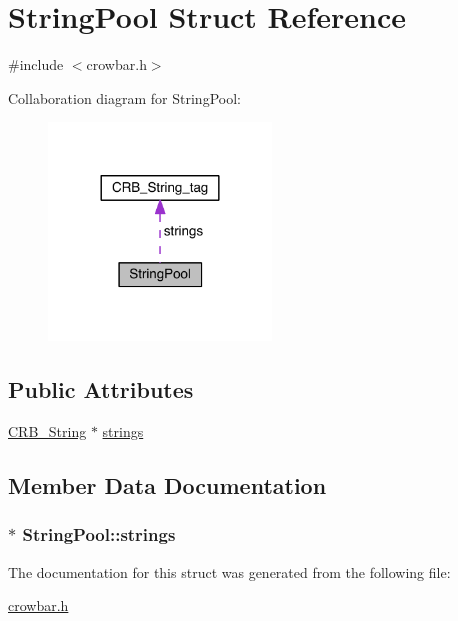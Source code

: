 \hypertarget{struct_string_pool}{}\section{String\+Pool Struct Reference}
\label{struct_string_pool}


{\ttfamily \#include $<$crowbar.\+h$>$}



Collaboration diagram for String\+Pool\+:\nopagebreak
\begin{figure}[H]
\begin{center}
\leavevmode
\includegraphics[width=168pt]{struct_string_pool__coll__graph}
\end{center}
\end{figure}
\subsection*{Public Attributes}
\begin{DoxyCompactItemize}
\item 
\hyperlink{_c_r_b__dev_8h_a0372b51b327f3425e983d9924fc713f8}{C\+R\+B\+\_\+\+String} $\ast$ \hyperlink{struct_string_pool_ac05ee15c6ce0fce010b86c2e25ca814e}{strings}
\end{DoxyCompactItemize}


\subsection{Member Data Documentation}
\hypertarget{struct_string_pool_ac05ee15c6ce0fce010b86c2e25ca814e}{}
\subsubsection[{strings}]{$\ast$ String\+Pool\+::strings}\label{struct_string_pool_ac05ee15c6ce0fce010b86c2e25ca814e}


The documentation for this struct was generated from the following file\+:\begin{DoxyCompactItemize}
\item 
\hyperlink{crowbar_8h}{crowbar.\+h}\end{DoxyCompactItemize}

